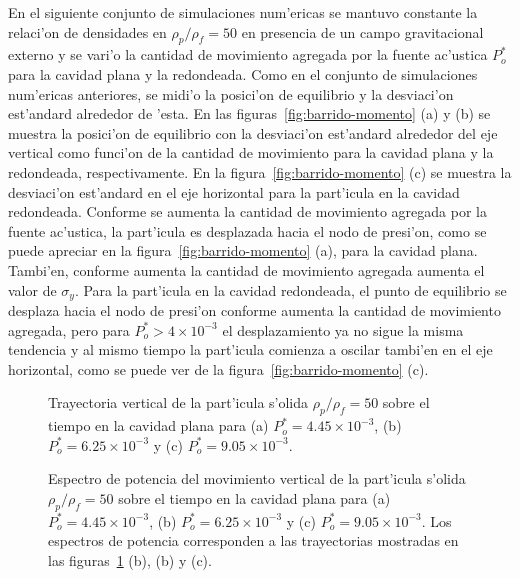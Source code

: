 En el siguiente conjunto de simulaciones num'ericas se mantuvo constante la
relaci'on de densidades en  $\rho_p/\rho_f=50$  en presencia de un campo
gravitacional externo y se vari'o la cantidad de movimiento
agregada por la fuente ac'ustica $P_o^\ast$  para la cavidad plana y
la redondeada. Como en el conjunto de simulaciones num'ericas anteriores, se midi'o la
posici'on de equilibrio y la desviaci'on est'andard alrededor de 'esta. 
En las figuras~\ref{fig:barrido-momento} (a) y (b) se muestra la posici'on de equilibrio
con la desviaci'on est'andard alrededor del eje vertical como funci'on de la cantidad
de movimiento para la cavidad plana y la redondeada, respectivamente. En la
figura~\ref{fig:barrido-momento} (c) se muestra la desviaci'on est'andard en el
eje horizontal para la part'icula  en la cavidad redondeada.  Conforme se aumenta la
cantidad de movimiento agregada por la fuente ac'ustica, la part'icula es desplazada hacia
el nodo de presi'on, como se puede apreciar en la figura~\ref{fig:barrido-momento} (a), para
la cavidad plana. Tambi'en, conforme aumenta la cantidad de movimiento agregada aumenta
el valor de $\sigma_y$.  Para la part'icula en la cavidad redondeada, el punto de equilibrio
se desplaza hacia el nodo de presi'on conforme aumenta la cantidad de movimiento
agregada, pero para $P_o^\ast > 4\times 10^{-3}$ el desplazamiento ya no sigue la misma tendencia
y al mismo tiempo la part'icula comienza a oscilar tambi'en en el eje horizontal, como se puede
ver de la figura~\ref{fig:barrido-momento} (c). 



\begin{figure}



%
%
\caption{\label{fig:paths-rho-30-flat}
Trayectoria vertical de la part'icula s'olida $\rho_p/\rho_f=50$ sobre el tiempo en la cavidad plana para
(a) $P_o^\ast = 4.45\times 10^{-3} $, (b) $P_o^\ast = 6.25\times 10^{-3}$ y (c) $P_o^\ast = 9.05\times 10^{-3}$.
}
\end{figure}
\begin{figure}



%
%
\caption{\label{fig:paths-rho-30-flat-spectrum}
Espectro de potencia del movimiento vertical de la part'icula s'olida $\rho_p/\rho_f=50$ sobre el tiempo en la cavidad plana para
(a) $P_o^\ast = 4.45\times 10^{-3} $, (b) $P_o^\ast = 6.25\times 10^{-3}$ y (c) $P_o^\ast = 9.05\times 10^{-3}$. 
Los espectros de potencia corresponden a las trayectorias mostradas en las 
figuras~\ref{fig:paths-rho-30-flat} (b), (b) y (c).
}
\end{figure}


